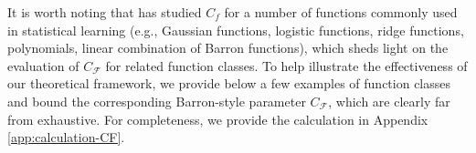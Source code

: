 \documentclass[english]{article}
\begin{document}
It is worth noting that \citet[Section~IX]{Barron1993Universal} has studied $C_f$ for a number of functions commonly used in statistical learning (e.g., Gaussian functions, logistic functions, ridge functions, polynomials, linear combination of Barron functions), which sheds light on the evaluation of $C_{\mathcal{F}}$ for related function classes. 
%
To help illustrate the effectiveness of our theoretical framework, we provide below a few examples of function classes and bound the corresponding Barron-style parameter $C_{\mathcal{F}}$, which are clearly far from exhaustive. 
For completeness, we provide the calculation in Appendix \ref{app:calculation-CF}. 
%
\end{document}
